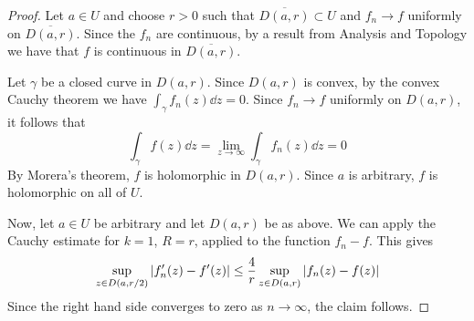 \begin{proof}
	Let \( a \in U \) and choose \( r > 0 \) such that \( \overline{D(a,r)} \subset U \) and \( f_n \to f \) uniformly on \( \overline{D(a,r)} \).
	Since the \( f_n \) are continuous, by a result from Analysis and Topology we have that \( f \) is continuous in \( \overline{D(a,r)} \).

	Let \( \gamma \) be a closed curve in \( D(a,r) \).
	Since \( D(a,r) \) is convex, by the convex Cauchy theorem we have \( \int_\gamma f_n(z) \dd{z} = 0 \).
	Since \( f_n \to f \) uniformly on \( D(a,r) \), it follows that
	\[ \int_\gamma f(z) \dd{z} = \lim_{z \to \infty} \int_\gamma f_n(z) \dd{z} = 0 \]
	By Morera's theorem, \( f \) is holomorphic in \( D(a,r) \).
	Since \( a \) is arbitrary, \( f \) is holomorphic on all of \( U \).

	Now, let \( a \in U \) be arbitrary and let \( D(a,r) \) be as above.
	We can apply the Cauchy estimate for \( k = 1 \), \( R = r \), applied to the function \( f_n - f \).
	This gives
	\[ \sup_{z \in D(a,r/2)} \abs{f_n'(z) - f'(z)} \leq \frac{4}{r} \sup_{z \in D(a,r)} \abs{f_n(z) - f(z)} \]
	Since the right hand side converges to zero as \( n \to \infty \), the claim follows.
\end{proof}
